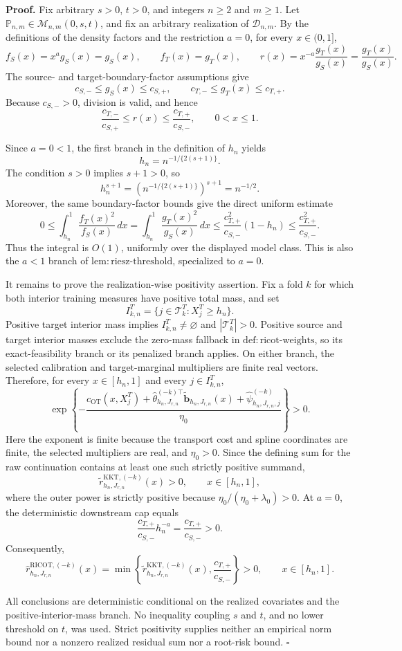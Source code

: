 \textbf{Proof.}
Fix arbitrary \(s>0\), \(t>0\), and integers \(n\ge2\) and \(m\ge1\).  Let \(\mathbb P_{n,m}\in\mathcal M_{n,m}(0,s,t)\), and fix an arbitrary realization of \(\mathcal D_{n,m}\).  By the definitions of the density factors and the restriction \(a=0\), for every \(x\in(0,1]\),
\[
 f_S(x)=x^a g_S(x)=g_S(x),
 \qquad
 f_T(x)=g_T(x),
 \qquad
 r(x)=x^{-a}\frac{g_T(x)}{g_S(x)}=\frac{g_T(x)}{g_S(x)}.
\]
The source- and target-boundary-factor assumptions give
\[
 c_{S,-}\le g_S(x)\le c_{S,+},
 \qquad
 c_{T,-}\le g_T(x)\le c_{T,+}.
\]
Because \(c_{S,-}>0\), division is valid, and hence
\[
 \frac{c_{T,-}}{c_{S,+}}
 \le r(x)
 \le \frac{c_{T,+}}{c_{S,-}},
 \qquad 0<x\le1.
\]

Since \(a=0<1\), the first branch in the definition of \(h_n\) yields
\[
 h_n=n^{-1/\{2(s+1)\}}.
\]
The condition \(s>0\) implies \(s+1>0\), so
\[
 h_n^{s+1}
 =\left(n^{-1/\{2(s+1)\}}\right)^{s+1}
 =n^{-1/2}.
\]
Moreover, the same boundary-factor bounds give the direct uniform estimate
\[
 0\le
 \int_{h_n}^1\frac{f_T(x)^2}{f_S(x)}\,dx
 =\int_{h_n}^1\frac{g_T(x)^2}{g_S(x)}\,dx
 \le \frac{c_{T,+}^2}{c_{S,-}}(1-h_n)
 \le \frac{c_{T,+}^2}{c_{S,-}}.
\]
Thus the integral is \(O(1)\), uniformly over the displayed model class.  This is also the \(a<1\) branch of \(\mathrm{lem{:}riesz\text{-}threshold}\), specialized to \(a=0\).

It remains to prove the realization-wise positivity assertion.  Fix a fold \(k\) for which both interior training measures have positive total mass, and set
\[
 I^T_{k,n}=\{j\in\mathcal T^T_k:X_j^T\ge h_n\}.
\]
Positive target interior mass implies \(I^T_{k,n}\ne\varnothing\) and \(|\mathcal T^T_k|>0\).  Positive source and target interior masses exclude the zero-mass fallback in \(\mathrm{def{:}ricot\text{-}weights}\), so its exact-feasibility branch or its penalized branch applies.  On either branch, the selected calibration and target-marginal multipliers are finite real vectors.  Therefore, for every \(x\in[h_n,1]\) and every \(j\in I^T_{k,n}\),
\[
 \exp\!\left\{-\frac{c_{\mathrm{OT}}(x,X_j^T)
 +\widehat\theta_{h_n,J_{r,n}}^{(-k)\top}
 \widetilde{\mathbf b}_{h_n,J_{r,n}}(x)
 +\widehat\psi^{(-k)}_{h_n,J_{r,n},j}}{\eta_0}\right\}>0.
\]
Here the exponent is finite because the transport cost and spline coordinates are finite, the selected multipliers are real, and \(\eta_0>0\).  Since the defining sum for the raw continuation contains at least one such strictly positive summand,
\[
 \widetilde r^{\mathrm{KKT},(-k)}_{h_n,J_{r,n}}(x)>0,
 \qquad x\in[h_n,1],
\]
where the outer power is strictly positive because \(\eta_0/(\eta_0+\lambda_0)>0\).  At \(a=0\), the deterministic downstream cap equals
\[
 \frac{c_{T,+}}{c_{S,-}}h_n^{-a}
 =\frac{c_{T,+}}{c_{S,-}}>0.
\]
Consequently,
\[
 \widehat r^{\mathrm{RICOT},(-k)}_{h_n,J_{r,n}}(x)
 =\min\!\left\{
 \widetilde r^{\mathrm{KKT},(-k)}_{h_n,J_{r,n}}(x),
 \frac{c_{T,+}}{c_{S,-}}
 \right\}>0,
 \qquad x\in[h_n,1].
\]

All conclusions are deterministic conditional on the realized covariates and the positive-interior-mass branch.  No inequality coupling \(s\) and \(t\), and no lower threshold on \(t\), was used.  Strict positivity supplies neither an empirical norm bound nor a nonzero realized residual sum nor a root-risk bound. \(\square\)